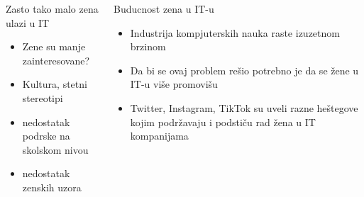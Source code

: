\documentclass[aspectratio=169]{beamer}
\begin{document}
{
\begin{frame}
  
    \begin{columns}
        \begin{block}{Zasto tako malo zena ulazi u IT}
            \begin{itemize}
            \item<1-> Zene su manje zainteresovane?
            \item<2-> Kultura, stetni stereotipi
            \item<3-> nedostatak podrske na skolskom nivou 
            \item<4-> nedostatak zenskih uzora
            \end{itemize}
        \end{block}  

        \begin{block}{Buducnost zena u IT-u}
            \begin{itemize}
                \item<5-> Industrija kompjuterskih nauka raste izuzetnom brzinom

                \item<6-> Da bi se ovaj problem rešio potrebno je da se žene u IT-u više promovišu

                \item<7-> Twitter, Instagram, TikTok su uveli razne heštegove kojim podržavaju i podstiču rad žena u IT kompanijama 
            \end{itemize}
        \end{block}        
    \end{columns}
   
\end{frame}
}
\end{document}
